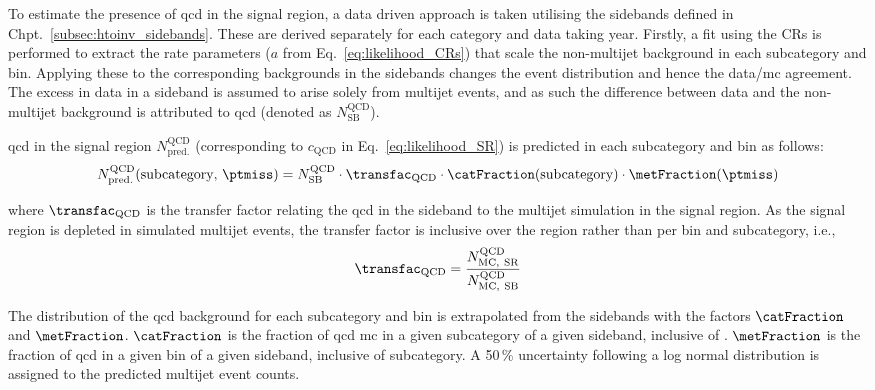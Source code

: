 To estimate the presence of \acrshort{qcd} in the signal region, a data driven approach is taken utilising the sidebands defined in Chpt.~\ref{subsec:htoinv_sidebands}. These are derived separately for each category and data taking year. Firstly, a fit using the \glspl{CR} is performed to extract the rate parameters ($a$ from Eq.~\ref{eq:likelihood_CRs}) that scale the non-multijet background in each subcategory and \ptmiss bin. Applying these to the corresponding backgrounds in the sidebands changes the event distribution and hence the data/\acrshort{mc} agreement. The excess in data in a sideband is assumed to arise solely from multijet events, and as such the difference between data and the non-multijet background is attributed to \acrshort{qcd} (denoted as $N_{\mathrm{SB}}^{\mathrm{QCD}}$).

\acrshort{qcd} in the signal region $N_{\mathrm{pred.}}^{\mathrm{QCD}}$ (corresponding to $c_{\mathrm{QCD}}$ in Eq.~\ref{eq:likelihood_SR}) is predicted in each subcategory and \ptmiss bin as follows: 
\begin{equation}
    N_{\mathrm{pred.}}^{\mathrm{QCD}}(\text{subcategory}, \, \ptmiss) = N_{\mathrm{SB}}^{\mathrm{QCD}} \cdot \transfac_{\mathrm{QCD}} \cdot \catFraction(\text{subcategory}) \cdot \metFraction(\ptmiss)
    \label{eq:qcd_prediction}
\end{equation}

where $\transfac_{\mathrm{QCD}}$ is the transfer factor relating the \acrshort{qcd} in the sideband to the multijet simulation in the signal region. As the signal region is depleted in simulated multijet events, the transfer factor is inclusive over the region rather than per \ptmiss bin and subcategory, i.e.,
\begin{equation}
    \transfac_{\mathrm{QCD}} = \frac{ N_{\mathrm{MC, \ SR}}^{\mathrm{QCD}} } { N_{\mathrm{MC, \ SB}}^{\mathrm{QCD}} }
    \label{eq:transfer_factor_qcd}
\end{equation}

The distribution of the \acrshort{qcd} background for each subcategory and \ptmiss bin is extrapolated from the sidebands with the factors $\catFraction$ and $\metFraction$. $\catFraction$ is the fraction of \acrshort{qcd} \acrshort{mc} in a given subcategory of a given sideband, inclusive of \ptmiss. $\metFraction$ is the fraction of \acrshort{qcd} in a given \ptmiss bin of a given sideband, inclusive of subcategory. A 50\,\% uncertainty following a log normal distribution is assigned to the predicted multijet event counts.
